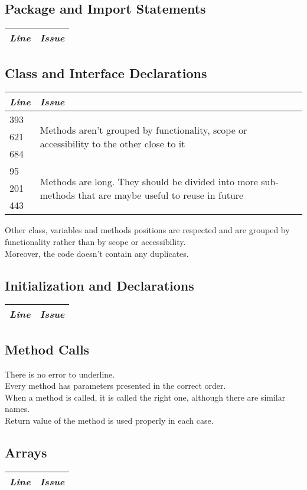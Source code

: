 \documentclass[11pt,a4paper]{report}
\begin{document}
\subsection{Package and Import Statements}
\begin{tabularx}{\textwidth}{|l|X|}
	\hline
	\textit{Line} & \textit{Issue}\\
	\hline
\end{tabularx}
\subsection{Class and Interface Declarations}
\begin{tabularx}{\textwidth}{|l|X|}
	\hline
	\textit{Line} & \textit{Issue}\\
	\hline
	393 & \multirow{3}{*}{Methods aren't grouped by functionality, scope or accessibility to the other close to it}\\
	621 & \\
	684 & \\
	\hline
	95 & \multirow{3}{*}{Methods are long. They should be divided into more sub-methods that are maybe useful to reuse in future}\\
	201 & \\
	443 & \\
	\hline
\end{tabularx}
Other class, variables and methods positions are respected and are grouped by functionality rather than by scope or accessibility.\\Moreover, the code doesn't contain any duplicates.
\subsection{Initialization and Declarations}
\begin{tabularx}{\textwidth}{|l|X|}
	\hline
	\textit{Line} & \textit{Issue}\\
	\hline
\end{tabularx}
\subsection{Method Calls}
There is no error to underline.\\Every method has parameters presented in the correct order.\\When a method is called, it is called the right one, although there are similar names.\\Return value of the method is used properly in each case. 
\subsection{Arrays}
\begin{tabularx}{\textwidth}{|l|X|}
	\hline
	\textit{Line} & \textit{Issue}\\
	\hline
\end{tabularx}
\end{document}
